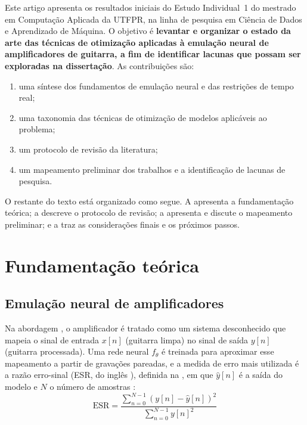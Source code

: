 \documentclass[%
  a4paper,%
  12pt,%
  fleqn,%
  english,%
  brazilian,%
]{article}
\begin{document}
Este artigo apresenta os resultados iniciais do Estudo Individual~1 do mestrado em Computação Aplicada da UTFPR, na linha de pesquisa em Ciência de Dados e Aprendizado de Máquina.
O objetivo é \textbf{levantar e organizar o estado da arte das técnicas de otimização aplicadas à emulação neural de amplificadores de guitarra, a fim de identificar lacunas que possam ser exploradas na dissertação}.
As contribuições são:
\begin{enumerate}[label = {\alph*)}]
\item uma síntese dos fundamentos de emulação neural e das restrições de tempo real;
\item uma taxonomia das técnicas de otimização de modelos aplicáveis ao problema;
\item um protocolo de revisão da literatura;
\item um mapeamento preliminar dos trabalhos e a identificação de lacunas de pesquisa.
\end{enumerate}

O restante do texto está organizado como segue.
A  apresenta a fundamentação teórica; a  descreve o protocolo de revisão; a  apresenta e discute o mapeamento preliminar; e a  traz as considerações finais e os próximos passos.

\section{Fundamentação teórica}%
\label{sect:fund}

\subsection{Emulação neural de amplificadores}%
\label{ssect:emul}

Na abordagem , o amplificador é tratado como um sistema desconhecido que mapeia o sinal de entrada $x[n]$ (guitarra limpa) no sinal de saída $y[n]$ (guitarra processada).
Uma rede neural $f_{\theta}$ é treinada para aproximar esse mapeamento a partir de gravações pareadas, e a medida de erro mais utilizada é a razão erro-sinal (ESR, do inglês ), definida na , em que $\hat{y}[n]$ é a saída do modelo e $N$ o número de amostras \cite{Wright2020}:
\begin{equation}%
\label{eq:esr}
\mathrm{ESR} = \frac{\sum_{n=0}^{N-1} \left(y[n] - \hat{y}[n]\right)^{2}}{\sum_{n=0}^{N-1} y[n]^{2}}
\end{equation}
\end{document}
